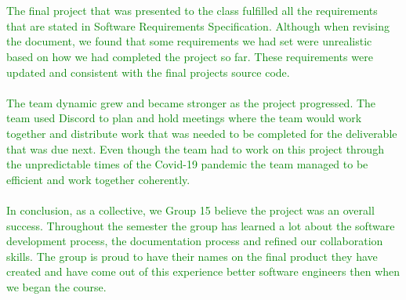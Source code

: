 \documentclass{article}
\begin{document}
\\ \\
\textcolor{Green}{The final project that was presented to the class fulfilled all the requirements that are stated in Software Requirements Specification. Although when revising the document, we found that some requirements we had set were unrealistic based on how we had completed the project so far. These requirements were updated and consistent with the final projects source code.}
\\ \\
\textcolor{Green}{The team dynamic grew and became stronger as the project progressed. The team used Discord to plan and hold meetings where the team would work together and distribute work that was needed to be completed for the deliverable that was due next. Even though the team had to work on this project through the unpredictable times of the Covid-19 pandemic the team managed to be efficient and work together coherently.}
\\ \\
\textcolor{Green}{In conclusion, as a collective, we Group 15 believe the project was an overall success. Throughout the semester the group has learned a lot about the software development process, the documentation process and refined our collaboration skills. The group is proud to have their names on the final product they have created and have come out of this experience better software engineers then when we began the course.}
\end{document}
